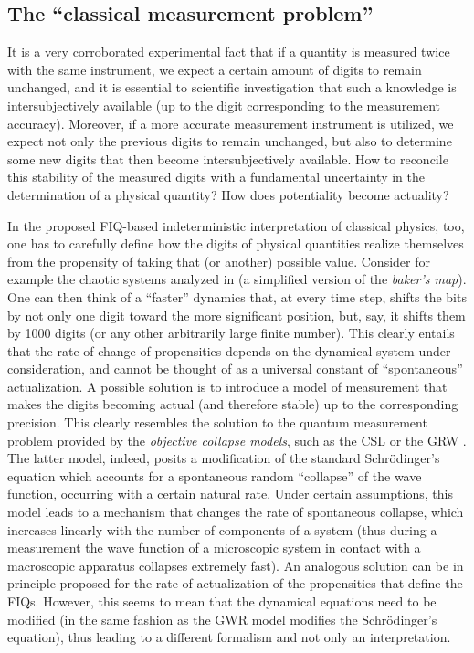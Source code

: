 \documentclass[aps,prl,twocolumn,showpacs,superscriptaddress,groupedaddress, nofootinbib]{revtex4-1}
\begin{document}
 \subsection{The ``classical measurement problem''} 
It is a very corroborated experimental fact that if a quantity is measured twice with the same instrument, we expect a certain amount of digits to remain unchanged, and it is essential to scientific investigation that such a knowledge is intersubjectively available (up to the digit corresponding to the measurement accuracy). Moreover, if a more accurate measurement instrument is utilized, we expect not only the previous digits to remain unchanged, but also to determine some new digits that then become intersubjectively available. How to reconcile this stability of the measured digits with a fundamental uncertainty in the determination of a physical quantity? How does potentiality  become actuality?

In the proposed FIQ-based indeterministic interpretation of classical physics, too, one has to carefully define how the digits of physical quantities realize themselves from the propensity of taking that (or another) possible value. Consider for example the chaotic systems analyzed in \cite{gisin1} (a simplified version of the \emph{baker's map}). One can then think of a ``faster'' dynamics that, at every time step, shifts the bits by not only one digit toward the more significant position, but, say, it shifts them by 1000 digits (or any other arbitrarily large finite number). This clearly entails that the rate of change of propensities depends on the dynamical system under consideration, and cannot be thought of as a universal constant of ``spontaneous'' actualization.  A possible solution is to introduce a model of measurement that makes the digits becoming actual (and therefore stable) up to the corresponding precision. This clearly resembles the solution to the quantum measurement problem provided by the \emph{objective collapse models}, such as the CSL \cite{gisincollapse, cls} or the GRW \cite{grw, belljumps}. The latter model, indeed, posits a modification of the standard Schr{\"o}dinger's equation which accounts for a spontaneous random ``collapse'' of the wave function, occurring with a certain natural rate. Under certain assumptions, this model leads to a mechanism that changes the rate of spontaneous collapse, which increases linearly with the number of components of a system (thus during a measurement the wave function of a microscopic system in contact with a macroscopic apparatus collapses extremely fast). An analogous solution can be in principle proposed for the rate of actualization of the propensities that define the FIQs. However, this seems to mean that the dynamical equations need to be modified (in the same fashion as the GWR model modifies the Schr{\"o}dinger's equation), thus leading to a different formalism and not only an interpretation.
\end{document}
